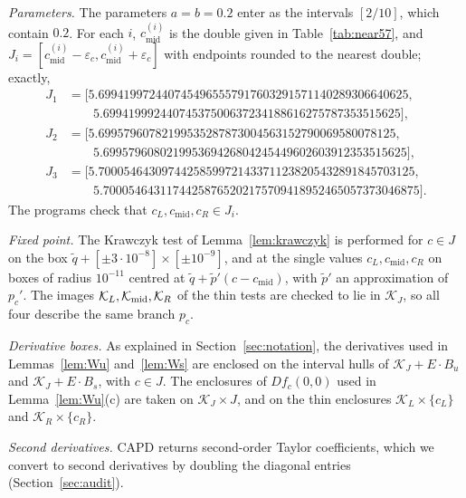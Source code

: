 \documentclass[11pt]{amsart}
\theoremstyle{definition}
\theoremstyle{remark}
\newcommand{\ival}[1]{[#1]}
\newcommand{\cmid}{c_{\mathrm{mid}}}
\newcommand{\Kr}{\mathcal{K}}
\begin{document}
\emph{Parameters.} The parameters $a=b=0.2$ enter as the intervals $\ival{2/10}$, which contain $0.2$. For
each $i$, $\cmid^{(i)}$ is the double given in Table~\ref{tab:near57}, and
$J_i=[\cmid^{(i)}-\varepsilon_c,\cmid^{(i)}+\varepsilon_c]$ with endpoints rounded to the nearest double;
exactly,
\begin{equation}\label{eq:Ji}
\begin{aligned}
J_1&=[5.6994199724407454965557917603291571140289306640625,\\
&\qquad 5.69941999244074537500637234188616275787353515625],\\
J_2&=[5.69957960782199535287873004563152790069580078125,\\
&\qquad 5.699579608021995369426804245449602603912353515625],\\
J_3&=[5.70005464309744258599721433711238205432891845703125,\\
&\qquad 5.70005464311744258765202175709418952465057373046875].
\end{aligned}
\end{equation}
The programs check that $c_L,\cmid,c_R\in J_i$.

\emph{Fixed point.} The Krawczyk test of Lemma~\ref{lem:krawczyk} is performed for $c\in J$ on the box
$\tilde q+[\pm3\cdot10^{-8}]\times[\pm10^{-9}]$, and at the single values $c_L,\cmid,c_R$ on boxes of radius
$10^{-11}$ centred at $\tilde q+\tilde p'(c-\cmid)$, with $\tilde p'$ an approximation of $p_c'$. The images
$\Kr_L,\Kr_{\rm mid},\Kr_R$ of the thin tests are checked to lie in $\Kr_J$, so all four describe the same
branch $p_c$.

\emph{Derivative boxes.} As explained in Section~\ref{sec:notation}, the derivatives used in
Lemmas~\ref{lem:Wu} and~\ref{lem:Ws} are enclosed on the interval hulls of $\Kr_J+E\cdot B_u$ and
$\Kr_J+E\cdot B_s$, with $c\in J$. The enclosures of $Df_c(0,0)$ used in Lemma~\ref{lem:Wu}(c) are taken on
$\Kr_J\times J$, and on the thin enclosures $\Kr_L\times\{c_L\}$ and $\Kr_R\times\{c_R\}$.

\emph{Second derivatives.} CAPD returns second-order Taylor coefficients, which we convert to second
derivatives by doubling the diagonal entries (Section~\ref{sec:audit}).
\end{document}
